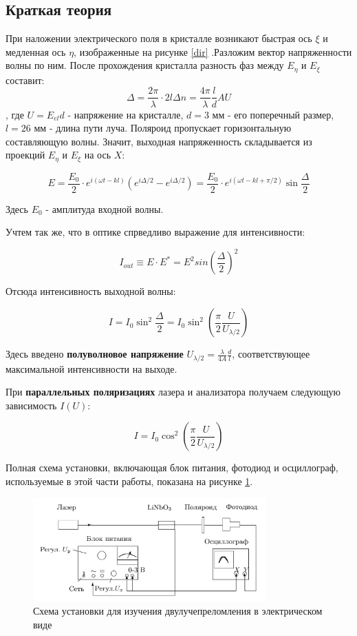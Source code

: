     \subsection{Краткая теория}
	
	
	При наложении электрического поля в кристалле возникают быстрая ось $\xi$ и медленная ось $\eta$, изображенные на рисунке \ref{dir}
	.Разложим вектор напряженности волны по ним. После прохождения кристалла разность фаз между $E_\eta$ и $E_\xi$ составит:
	\[ \Delta = \frac{2\pi}{\lambda} \cdot2l\Delta n = \frac{4\pi}{\lambda} \frac{l}{d} AU \]
	, где $U = E_{el}d$ - напряжение на кристалле, $d = 3$ мм - его поперечный размер, $l = 26$ мм - длина пути луча. 
	Поляроид пропускает горизонтальную составляющую волны. Значит, выходная напряженность складывается из проекций $E_\eta$ и $E_\xi$ на ось $X$:
	
	\[ E = \frac{E_0}{2} \cdot e^{i(\omega t - kl)} (e^{i\Delta/2} - e^{i\Delta/2}) = \frac{E_0}{2} \cdot  e^{i(\omega t - kl + \pi/2)} \sin\frac{\Delta}{2} \]
	
	Здесь $E_0$ - амплитуда входной волны.
	
	Учтем так же, что в оптике спрведливо выражение для интенсивности:
	
	\[ I_{out} \equiv E\cdot E^{*} = E ^{2} sin(\frac{\Delta}{2})^{2}  \]
	
	Отсюда интенсивность выходной волны: 
	
	\begin{equation}
		I = I_0 \sin^2\frac{\Delta}{2} = I_0\sin^2 \left(\frac{\pi}{2}\frac{U}{U_{\lambda/2}}\right) 
	\end{equation}
	
	Здесь введено \textbf{полуволновое напряжение} $U_{\lambda/2} = \frac{\lambda}{4A}\frac{d}{l}$, соответствующее максимальной интенсивности на выходе.
	
	При \textbf{параллельных поляризациях} лазера и анализатора получаем следующую зависимость $I(U)$:
	
	\begin{equation}
		I = I_0 \cos^2\left(\frac{\pi}{2}\frac{U}{U_{\lambda/2}}\right)
	\end{equation} 
	
	Полная схема установки, включающая блок питания, фотодиод и осциллограф, используемые в этой части работы, показана на рисунке \ref{full}. 
	
	\begin{figure}[h]
		\centering	
		\includegraphics[width=0.8\textwidth]{pics/fullpic.png}
		\caption{Схема установки для изучения двулучепреломления в электрическом виде}
		\label{full}
	\end{figure}

